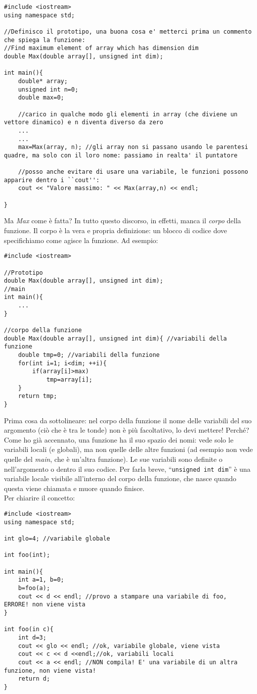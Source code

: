 \begin{lstlisting}
#include <iostream>
using namespace std;

//Definisco il prototipo, una buona cosa e' metterci prima un commento che spiega la funzione:
//Find maximum element of array which has dimension dim
double Max(double array[], unsigned int dim); 

int main(){
	double* array;
	unsigned int n=0;
	double max=0;
	
	//carico in qualche modo gli elementi in array (che diviene un vettore dinamico) e n diventa diverso da zero
	...
	...
	max=Max(array, n); //gli array non si passano usando le parentesi quadre, ma solo con il loro nome: passiamo in realta' il puntatore
	
	//posso anche evitare di usare una variabile, le funzioni possono apparire dentro i ``cout'':
	cout << "Valore massimo: " << Max(array,n) << endl;
	
}
\end{lstlisting}

Ma \emph{Max} come è fatta? In tutto questo discorso, in effetti, manca il \emph{corpo} della funzione. Il corpo è la vera e propria definizione: un blocco di codice dove specifichiamo come agisce la funzione.  Ad esempio:
\begin{lstlisting}
#include <iostream>

//Prototipo
double Max(double array[], unsigned int dim);
//main
int main(){
	...
}

//corpo della funzione
double Max(double array[], unsigned int dim){ //variabili della funzione
	double tmp=0; //variabili della funzione
	for(int i=1; i<dim; ++i){
		if(array[i]>max)
			tmp=array[i];	
	}
	return tmp;
}
\end{lstlisting}

Prima cosa da sottolineare: nel corpo della funzione il nome delle variabili del suo argomento (ciò che è tra le tonde) non è più facoltativo, lo devi mettere! Perché? Come ho già accennato, una funzione ha il suo spazio dei nomi: vede solo le variabili locali (e globali), ma non quelle delle altre funzioni (ad esempio non vede quelle del \emph{main}, che è un'altra funzione). Le sue variabili sono definite o nell'argomento o dentro il suo codice. Per farla breve, ``\lstinline|unsigned int dim|'' è una variabile locale visibile all'interno del corpo della funzione, che nasce quando questa viene chiamata e muore quando finisce.\\

Per chiarire il concetto:
\begin{lstlisting}
#include <iostream>
using namespace std;

int glo=4; //variabile globale

int foo(int);

int main(){
	int a=1, b=0;
	b=foo(a);
	cout << d << endl; //provo a stampare una variabile di foo, ERRORE! non viene vista
}

int foo(in c){
	int d=3;
	cout << glo << endl; //ok, variabile globale, viene vista
	cout << c << d <<endl;//ok, variabili locali
	cout << a << endl; //NON compila! E' una variabile di un altra funzione, non viene vista!
	return d;
}
\end{lstlisting}

